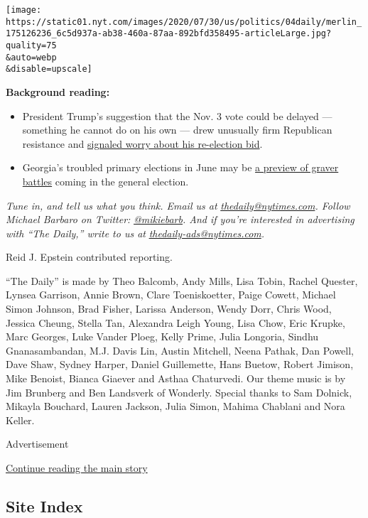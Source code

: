 \texttt{[image: https://static01.nyt.com/images/2020/07/30/us/politics/04daily/merlin\_175126236\_6c5d937a-ab38-460a-87aa-892bfd358495-articleLarge.jpg?quality=75\\\&auto=webp\\\&disable=upscale]}

\textbf{Background reading:}

\begin{itemize}
\item
  President Trump's suggestion that the Nov. 3 vote could be delayed ---
  something he cannot do on his own --- drew unusually firm Republican
  resistance and
  \href{https://www.nytimes.com/2020/07/30/us/politics/trump-delay-2020-election.html}{signaled
  worry about his re-election bid}.
\item
  Georgia's troubled primary elections in June may be
  \href{https://www.nytimes.com/2020/06/11/podcasts/the-daily/georgia-general-election.html}{a
  preview of graver battles} coming in the general election.
\end{itemize}

\emph{Tune in, and tell us what you think. Email us at}
\href{mailto:thedaily@nytimes.com}{\emph{thedaily@nytimes.com}}\emph{.
Follow Michael Barbaro on Twitter:}
\href{https://twitter.com/mikiebarb}{\emph{@mikiebarb}}\emph{. And if
you're interested in advertising with ``The Daily,'' write to us at}
\href{mailto:thedaily-ads@nytimes.com}{\emph{thedaily-ads@nytimes.com}}\emph{.}

Reid J. Epstein contributed reporting.

``The Daily'' is made by Theo Balcomb, Andy Mills, Lisa Tobin, Rachel
Quester, Lynsea Garrison, Annie Brown, Clare Toeniskoetter, Paige
Cowett, Michael Simon Johnson, Brad Fisher, Larissa Anderson, Wendy
Dorr, Chris Wood, Jessica Cheung, Stella Tan, Alexandra Leigh Young,
Lisa Chow, Eric Krupke, Marc Georges, Luke Vander Ploeg, Kelly Prime,
Julia Longoria, Sindhu Gnanasambandan, M.J. Davis Lin, Austin Mitchell,
Neena Pathak, Dan Powell, Dave Shaw, Sydney Harper, Daniel Guillemette,
Hans Buetow, Robert Jimison, Mike Benoist, Bianca Giaever and Asthaa
Chaturvedi. Our theme music is by Jim Brunberg and Ben Landsverk of
Wonderly. Special thanks to Sam Dolnick, Mikayla Bouchard, Lauren
Jackson, Julia Simon, Mahima Chablani and Nora Keller.

Advertisement

\protect\hyperlink{after-bottom}{Continue reading the main story}

\hypertarget{site-index}{%
\subsection{Site Index}\label{site-index}}

